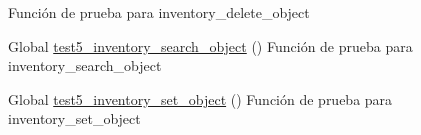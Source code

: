 \begin{DoxyRefList}
%
Función de prueba para inventory\+\_\+delete\+\_\+object  
\item[Global \mbox{\hyperlink{inventory__test_8c_a0c776d6245202f4d3fef6816fb54cf2d}{test5\+\_\+inventory\+\_\+search\+\_\+object}} ()]\label{test__test000066}%
%
Función de prueba para inventory\+\_\+search\+\_\+object  
\item[Global \mbox{\hyperlink{inventory__test_8c_af3214c45d3ebaefe862514acb977a418}{test5\+\_\+inventory\+\_\+set\+\_\+object}} ()]\label{test__test000043}%
%
Función de prueba para inventory\+\_\+set\+\_\+object 
\end{DoxyRefList}